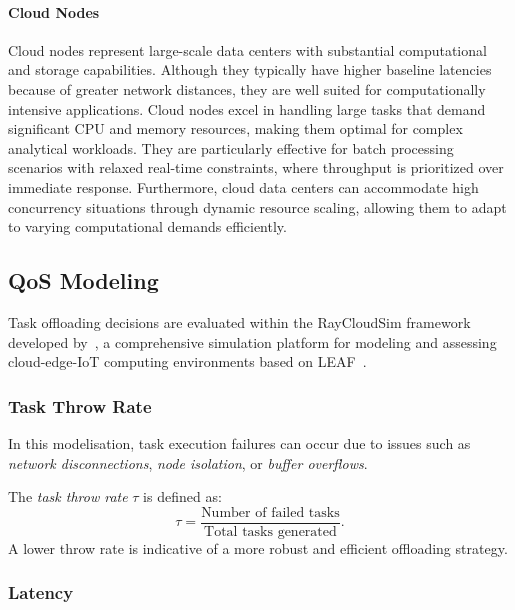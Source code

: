 \documentclass[preprint,3p,authoryear]{elsarticle}
\begin{document}
\paragraph{Cloud Nodes}\label{subsubsec:Cloud}
Cloud nodes represent large-scale data centers with substantial computational and storage capabilities. Although they typically have higher baseline latencies because of greater network distances, they are well suited for computationally intensive applications. Cloud nodes excel in handling large tasks that demand significant CPU and memory resources, making them optimal for complex analytical workloads. They are particularly effective for batch processing scenarios with relaxed real-time constraints, where throughput is prioritized over immediate response. Furthermore, cloud data centers can accommodate high concurrency situations through dynamic resource scaling, allowing them to adapt to varying computational demands efficiently.


\subsection{QoS Modeling}\label{sec:qos_modeling}

Task offloading decisions are evaluated within the RayCloudSim framework developed by~\cite{zhang2022osttd}, a comprehensive simulation platform for modeling and assessing cloud-edge-IoT computing environments based on LEAF~\citep{WiesnerThamsen_LEAF_2021}.

\subsubsection{Task Throw Rate}\label{subsubsec:task_throw_rate}

In this modelisation, task execution failures can occur due to issues such as \emph{network disconnections}, \emph{node isolation}, or \emph{buffer overflows}.

The \emph{task throw rate} \(\tau\) is defined as:
\begin{equation}
\tau = \frac{\text{Number of failed tasks}}{\text{Total tasks generated}}.
\end{equation}
A lower throw rate is indicative of a more robust and efficient offloading strategy.

\subsubsection{Latency}\label{subsubsec:latency}
\end{document}
